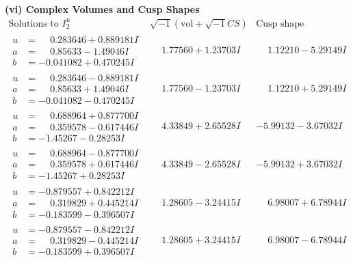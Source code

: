 \documentclass[1p]{elsarticle_modified}
\theoremstyle{definition}
\newcommand{\I}{\sqrt{-1}}
\begin{document}
\newpage\flushleft \textbf{(vi) Complex Volumes and Cusp Shapes}
$$\begin{array}{c|c|c}  
\text{Solutions to }I^u_{2}& \I (\text{vol} + \sqrt{-1}CS) & \text{Cusp shape}\\
 \hline 
\begin{aligned}
u &= \phantom{-}0.283646 + 0.889181 I \\
a &= \phantom{-}0.85633 - 1.49046 I \\
b &= -0.041082 + 0.470245 I\end{aligned}
 & \phantom{-}1.77560 + 1.23703 I & \phantom{-}1.12210 - 5.29149 I \\ \hline\begin{aligned}
u &= \phantom{-}0.283646 - 0.889181 I \\
a &= \phantom{-}0.85633 + 1.49046 I \\
b &= -0.041082 - 0.470245 I\end{aligned}
 & \phantom{-}1.77560 - 1.23703 I & \phantom{-}1.12210 + 5.29149 I \\ \hline\begin{aligned}
u &= \phantom{-}0.688964 + 0.877700 I \\
a &= \phantom{-}0.359578 - 0.617446 I \\
b &= -1.45267 - 0.28253 I\end{aligned}
 & \phantom{-}4.33849 + 2.65528 I & -5.99132 - 3.67032 I \\ \hline\begin{aligned}
u &= \phantom{-}0.688964 - 0.877700 I \\
a &= \phantom{-}0.359578 + 0.617446 I \\
b &= -1.45267 + 0.28253 I\end{aligned}
 & \phantom{-}4.33849 - 2.65528 I & -5.99132 + 3.67032 I \\ \hline\begin{aligned}
u &= -0.879557 + 0.842212 I \\
a &= \phantom{-}0.319829 + 0.445214 I \\
b &= -0.183599 - 0.396507 I\end{aligned}
 & \phantom{-}1.28605 - 3.24415 I & \phantom{-}6.98007 + 6.78944 I \\ \hline\begin{aligned}
u &= -0.879557 - 0.842212 I \\
a &= \phantom{-}0.319829 - 0.445214 I \\
b &= -0.183599 + 0.396507 I\end{aligned}
 & \phantom{-}1.28605 + 3.24415 I & \phantom{-}6.98007 - 6.78944 I \\ \hline\begin{aligned}

\end{aligned}
\end{array}$$
\end{document}
